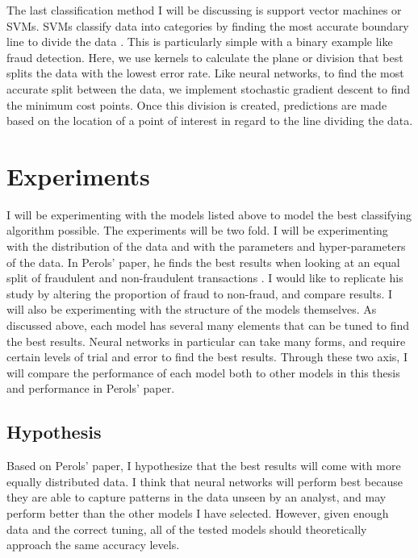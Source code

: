 \documentclass[midd]{thesis}
\begin{document}
The last classification method I will be discussing is support vector machines or SVMs. SVMs classify data into categories by finding the most accurate boundary line to divide the data \cite{Brownlee}. This is particularly simple with a binary example like fraud detection. Here, we use kernels to calculate the plane or division that best splits the data with the lowest error rate. Like neural networks, to find the most accurate split between the data, we implement stochastic gradient descent to find the minimum cost points. Once this division is created, predictions are made based on the location of a point of interest in regard to the line dividing the data. 

\section{Experiments}

I will be experimenting with the models listed above to model the best classifying algorithm possible. The experiments will be two fold. I will be experimenting with the distribution of the data and with the parameters and hyper-parameters of the data. In Perols' paper, he finds the best results when looking at an equal split of fraudulent and non-fraudulent transactions \cite{Perols2011}. I would like to replicate his study by altering the proportion of fraud to non-fraud, and compare results. I will also be experimenting with the structure of the models themselves. As discussed above, each model has several many elements that can be tuned to find the best results. Neural networks in particular can take many forms, and require certain levels of trial and error to find the best results. Through these two axis, I will compare the performance of each model both to other models in this thesis and performance in Perols' paper. 


\subsection{Hypothesis}

Based on Perols' paper, I hypothesize that the best results will come with more equally distributed data. I think that neural networks will perform best because they are able to capture patterns in the data unseen by an analyst, and may perform better than the other models I have selected. However, given enough data and the correct tuning, all of the tested models should theoretically approach the same accuracy levels. 
\end{document}
